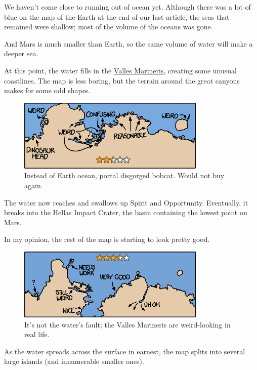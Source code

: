 {{We haven't come close to running out of ocean yet. Although there was a lot of blue on the map of the Earth at the end of our last article, the seas that remained were shallow; most of the volume of the oceans was gone.}

{And Mars is much smaller than Earth, so the same volume of water will make a deeper sea.}

{At this point, the water fills in the \href{http://en.wikipedia.org/wiki/Valles\_Marineris}{Valles Marineris}, creating some unusual coastlines. The map is less boring, but the terrain around the great canyons makes for some odd shapes.}

\begin{figure}[!htbp]
\centering
\includegraphics[scale=0.5, max width=0.8\textwidth]{imgs/a/54/mars_8.png}
\caption{Instead of Earth ocean, portal disgorged bobcat. Would not buy again.}
\end{figure}

{The water now reaches and swallows up Spirit and Opportunity. Eventually, it breaks into the Hellas Impact Crater, the basin containing the lowest point on Mars.}

{In my opinion, the rest of the map is starting to look pretty good.}

\begin{figure}[!htbp]
\centering
\includegraphics[scale=0.5, max width=0.8\textwidth]{imgs/a/54/mars_9.png}
\caption{It's not the water's fault; the Valles Marineris are weird-looking in real life.}
\end{figure}

{As the water spreads across the surface in earnest, the map splits into several large islands (and innumerable smaller ones).}

}
